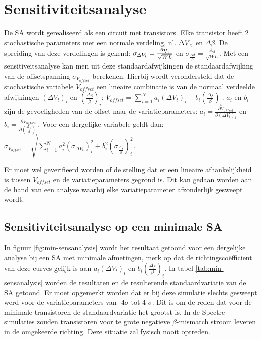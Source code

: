 \section{Sensitiviteitsanalyse}
De SA wordt gerealiseerd als een circuit met transistors. Elke transistor heeft 2 stochastische parameters met een normale verdeling, nl. $\Delta V\textsubscript{t}$ en $\Delta \beta$. De spreiding van deze verdelingen is gekend: $\sigma_{\Delta V_{t}} = \frac{A\textsubscript{V\textsubscript{t}}}{\sqrt{W L}}$ en $\sigma_\frac{{\Delta \beta}}{\beta} = \frac{A_{\beta}}{\sqrt{W L}}$. Met een sensitiveitsanalyse kan men uit deze standaardafwijkingen de standaardafwijking van de offsetspanning $\sigma_{V_{offset}}$ berekenen. Hierbij wordt verondersteld dat de stochastische variabele $V_{offset}$ een lineaire combinatie is van de normaal verdeelde afwijkingen $(\Delta V_{t})_{i}$ en $(\frac{\Delta_{\beta}}{\beta})_{i}$: $V_{offset}=\sum\limits_{i=1}^{N} a_{i} (\Delta V_{t})_{i} + b_{i} (\frac{\Delta_{\beta}}{\beta})_{i}$.
$a_{i}$ en $b_{i}$ zijn de gevoeligheden van de offset naar de variatieparameters: $a_{i}=\frac{\partial V_{offset}}{\partial (\Delta V_{t})_{i}}$ en $b_{i}=\frac{\partial V_{offset}}{\partial (\frac{\Delta_{\beta}}{\beta})_{i}}$.
Voor een dergelijke variabele geldt dan: $\sigma_{V_{offset}}=\sqrt{\sum\limits_{i=1}^{N} a_{i}^{2} (\sigma_{\Delta V_{t}})_{i}^{2} + b_{i}^{2} (\sigma_{\frac{\Delta_{\beta}}{\beta}})_{i}^{2}}$.

Er moet wel geverifieerd worden of de stelling dat er een lineaire afhankelijkheid is tussen $V_{offset}$ en de variatieparameters gegrond is.
Dit kan gedaan worden aan de hand van een analyse waarbij elke variatieparameter afzonderlijk gesweept wordt. 

\subsection{Sensitiviteitsanalyse op een minimale SA}
In figuur \ref{fig:min-sensanalysis} wordt het resultaat getoond voor een dergelijke analyse bij een SA met minimale afmetingen, merk op dat de richtingscoëfficient van deze curves gelijk is aan $a_{i} (\Delta V_{t})_{i}$ en $b_{i} (\frac{\Delta_{\beta}}{\beta})_{i}$.  In tabel \ref{tab:min-sensanalysis} worden de resultaten en de resulterende standaardvariatie van de SA getoond.
Er moet opgemerkt worden dat er bij deze simulatie slechts gesweept werd voor de variatieparameters van -4$\sigma$ tot 4 $\sigma$. Dit is om de reden dat voor de minimale transistoren de standaardvariatie het grootst is. In de Spectre-simulaties zouden transistoren voor te grote negatieve $\beta$-mismatch stroom leveren in de omgekeerde richting. Deze situatie zal fysisch nooit optreden.

